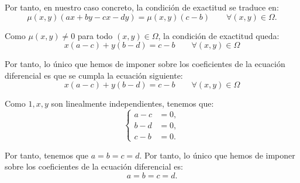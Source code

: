 \documentclass[12pt]{article}
\begin{document}
\begin{ejercicio}
        Por tanto, en nuestro caso concreto, la condición de exactitud se traduce en:
        \begin{equation*}
            \mu(x,y)(ax+by-cx-dy)=\mu(x,y)(c-b)\qquad \forall (x,y)\in\Omega.
        \end{equation*}

        Como $\mu(x,y)\neq 0$ para todo $(x,y)\in \Omega$, la condición de exactitud queda:
        \begin{equation*}
            x(a-c)+y(b-d)=c-b\qquad \forall (x,y)\in \Omega
        \end{equation*}

        Por tanto, lo único que hemos de imponer sobre los coeficientes de la ecuación diferencial es que se cumpla la ecuación siguiente:
        \begin{equation*}
            x(a-c)+y(b-d)=c-b\qquad \forall (x,y)\in \Omega
        \end{equation*}

        Como $1,x,y$ son linealmente independientes, tenemos que:
        \begin{equation*}
            \begin{cases}
                a-c &= 0,\\
                b-d &= 0,\\
                c-b &= 0.
            \end{cases}
        \end{equation*}

        Por tanto, tenemos que $a=b=c=d$. Por tanto, lo único que hemos de imponer sobre los coeficientes de la ecuación diferencial es:
        \begin{equation*}
            a=b=c=d.
        \end{equation*}
    \end{ejercicio}
\end{document}
